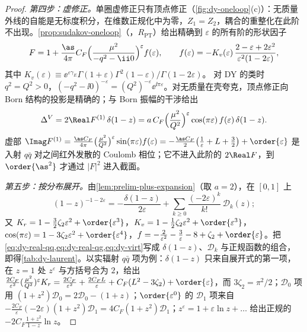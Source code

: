 \begin{proof}
\emph{第四步：虚修正。}单圈虚修正只有顶点修正（\cref{fig:dy-oneloop}(c)）：无质量外线的自能是无标度积分，在维数正规化中为零，$Z_1=Z_2$，耦合的重整化在此阶不出现。\cref{prop:sudakov-oneloop}（\tagR，$R_{\mathrm{PT}}$）给出精确到 $\varepsilon$ 的所有阶的形状因子
\[
F=1+\frac{\as}{4\pi}C_F\Big(\frac{\mu^2}{-q^2-\ii0}\Big)^{\varepsilon}f(\varepsilon),\qquad
f(\varepsilon)=-K_v(\varepsilon)\,\frac{2-\varepsilon+2\varepsilon^2}{\varepsilon^2(1-2\varepsilon)},
\]
其中 $K_v(\varepsilon)\equiv\ee^{\varepsilon\gamma_E}\Gamma(1+\varepsilon)\Gamma^2(1-\varepsilon)/\Gamma(1-2\varepsilon)$。
对 DY 的类时 $q^2=Q^2>0$，$(-q^2-\ii0)^{-\varepsilon}=(Q^2)^{-\varepsilon}\ee^{\ii\pi\varepsilon}$。对无质量在壳夸克，顶点修正向 Born 结构的投影是精确的；与 Born 振幅的干涉给出
\begin{equation}\label{eq:dy-virt}
\Delta^V=2\Real F^{(1)}\,\delta(1-z)=a\,C_F\Big(\frac{\mu^2}{Q^2}\Big)^{\varepsilon}\cos(\pi\varepsilon)\,f(\varepsilon)\,\delta(1-z).
\end{equation}
虚部 $\Imag F^{(1)}=\frac{\as C_F}{4\pi}\big(\frac{\mu^2}{Q^2}\big)^{\varepsilon}\sin(\pi\varepsilon)f(\varepsilon)=-\frac{\as C_F}{2}\big(\frac1\varepsilon+L+\frac32\big)+\order{\varepsilon}$ 是入射 $q\bar q$ 对之间红外发散的 Coulomb 相位；它不进入此阶的 $2\Real F$，到 $\order{\as^2}$ 才通过 $|F|^2$ 进入截面。

\emph{第五步：按分布展开。}由\cref{lem:prelim-plus-expansion}（取 $a=2$），在 $[0,1]$ 上
\[
(1-z)^{-1-2\varepsilon}=-\frac{\delta(1-z)}{2\varepsilon}+\sum_{k\ge0}\frac{(-2\varepsilon)^k}{k!}\,\mathcal D_k(z);
\]
又 $K_r=1-\frac32\zeta_2\varepsilon^2+\order{\varepsilon^3}$，$K_v=1-\frac12\zeta_2\varepsilon^2+\order{\varepsilon^3}$，$\cos(\pi\varepsilon)=1-3\zeta_2\varepsilon^2+\order{\varepsilon^4}$，$f=-\frac2{\varepsilon^2}-\frac3\varepsilon-8+\zeta_2+\order{\varepsilon}$。把\cref{eq:dy-real-qq,eq:dy-real-qg,eq:dy-virt}写成 $\delta(1-z)$、$\mathcal D_k$ 与正规函数的组合，即得\cref{tab:dy-laurent}。以实辐射 $q\bar q$ 项为例：$\delta(1-z)$ 只来自展开式的第一项，在 $z=1$ 处 $z^\varepsilon$ 与方括号合为 $2$，给出 $\frac{2C_F}{\varepsilon^2}(\frac{\mu^2}{Q^2})^\varepsilon K_r=\frac{2C_F}{\varepsilon^2}+\frac{2C_FL}{\varepsilon}+C_F(L^2-3\zeta_2)+\order{\varepsilon}$，而 $3\zeta_2=\pi^2/2$；$\mathcal D_0$ 项用 $(1+z^2)\mathcal D_0=2\mathcal D_0-(1+z)$；$\order{\varepsilon^0}$ 的 $\mathcal D_1$ 项来自 $-\frac{2C_F}{\varepsilon}(-2\varepsilon)(1+z^2)\mathcal D_1=4C_F(1+z^2)\mathcal D_1$；$z^\varepsilon=1+\varepsilon\ln z+\dots$ 给出正规的 $-2C_F\frac{1+z^2}{1-z}\ln z$。


\end{proof}
